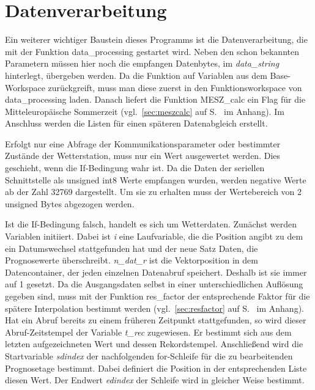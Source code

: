 \section{Datenverarbeitung}
Ein weiterer wichtiger Baustein dieses Programms ist die Datenverarbeitung, die mit der Funktion \textsf{data\_processing} gestartet wird. Neben den schon bekannten Parametern müssen hier noch die empfangen Datenbytes, im \textit{data\_string} hinterlegt, übergeben werden.
Da die Funktion auf Variablen aus dem Base-Workspace zurückgreift, muss man diese zuerst in den Funktionsworkspace von \textsf{data\_processing} laden. Danach liefert die Funktion \textsf{MESZ\_calc} ein Flag für die Mitteleuropäische Sommerzeit (vgl.~\ref{sec:meszcalc} auf S.~\pageref{sec:meszcalc} im Anhang). Im Anschluss werden die Listen für einen späteren Datenabgleich erstellt. 

Erfolgt nur eine Abfrage der Kommunikationsparameter oder bestimmter Zustände der Wetterstation, muss nur ein Wert ausgewertet werden. Dies geschieht, wenn die If-Bedingung wahr ist. Da die Daten der seriellen Schnittstelle als unsigned int8 Werte empfangen wurden, werden negative Werte ab der Zahl 32769 dargestellt. Um sie zu erhalten muss der Wertebereich von 2 unsigned Bytes abgezogen werden.         

Ist die If-Bedingung falsch, handelt es sich um Wetterdaten. Zunächst werden Variablen initiiert. Dabei ist \textit{i} eine Laufvariable, die die Position angibt zu dem ein Datumswechsel stattgefunden hat und der neue Satz Daten, die Prognosewerte überschreibt. \textit{n\_dat\_r} ist die Vektorposition in dem Datencontainer, der jeden einzelnen Datenabruf speichert. Deshalb ist sie immer auf 1 gesetzt. Da die Ausgangsdaten selbst in einer unterschiedlichen Auflösung gegeben sind, muss mit der Funktion \textsf{res\_factor} der entsprechende Faktor für die spätere Interpolation bestimmt werden (vgl.~\ref{sec:resfactor} auf S.~\pageref{sec:resfactor} im Anhang). Hat ein Abruf bereits zu einem früheren Zeitpunkt stattgefunden, so wird dieser Abruf-Zeitstempel der Variable \textit{t\_rec} zugewiesen. Er bestimmt sich aus dem letzten aufgezeichneten Wert und dessen Rekordstempel. Anschließend wird die Startvariable \textit{sdindex} der nachfolgenden for-Schleife für die zu bearbeitenden Prognosetage bestimmt. Dabei definiert die Position in der entsprechenden Liste diesen Wert. Der Endwert \textit{edindex} der Schleife wird in gleicher Weise bestimmt. 

